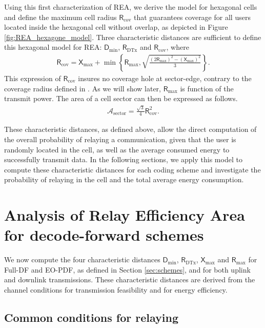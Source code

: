 \documentclass[journal]{IEEEtran}
\theoremstyle{definition}
\begin{document}
Using this first characterization of REA, we derive the model for hexagonal cells and define the maximum cell radius $\mathsf{R}_{\text{cov}}$ that guarantees coverage for all users located inside the hexagonal cell without overlap, as depicted in Figure \ref{fig:REA_hexagone_model}. Three characteristic distances are sufficient to define this hexagonal model for REA: $\mathsf{D}_{\min}$, $\mathsf{R}_{\text{DTx}}$ and $\mathsf{R}_{\text{cov}}$, where
\begin{align}
\mathsf{R}_{\text{cov}} = \mathsf{X}_{\max} + \min \left \{
\mathsf{R}_{\max},
\sqrt{\frac{\left(2\mathsf{R}_{\max}\right)^2 - \left(\mathsf{X}_{\max}\right)^2}{3}}
\right \} .
 \label{eq:R_cov}
\end{align}
This expression of $\mathsf{R}_{\text{cov}}$ insures no coverage hole at sector-edge, contrary to the coverage radius defined in \cite{joshi2011,khakurel2012} . 
As we will show later, $\mathsf{R}_{\max}$ is function of the transmit power.
The area of a cell sector can then be expressed as follows.
\begin{align}
\mathcal{A}_{\text{sector}} = \frac{\sqrt{3}}{4} \mathsf{R}_{\text{cov}}^2 .
\label{eq:aire_}
\end{align}

These characteristic distances, as defined above, allow the direct computation of the overall probability of relaying a communication, given that the user is randomly located in the cell, as well as the average consumed energy to successfully transmit data.
In the following sections, we apply this model to compute these characteristic distances for each coding scheme and investigate the probability of relaying in the cell and the total average energy consumption.




\section{Analysis of Relay Efficiency Area for decode-forward schemes}
\label{sec:analysis_model}

We now compute the four characteristic distances $\mathsf{D}_{\min}$, $\mathsf{R}_{\text{DTx}}$, $\mathsf{X}_{\max}$ and $\mathsf{R}_{\max}$ for Full-DF and EO-PDF, as defined in Section \ref{sec:schemes}, and for both uplink and downlink transmissions.
These characteristic distances are derived from the channel conditions for transmission feasibility and for energy efficiency.


\subsection{Common conditions for relaying}
\end{document}
